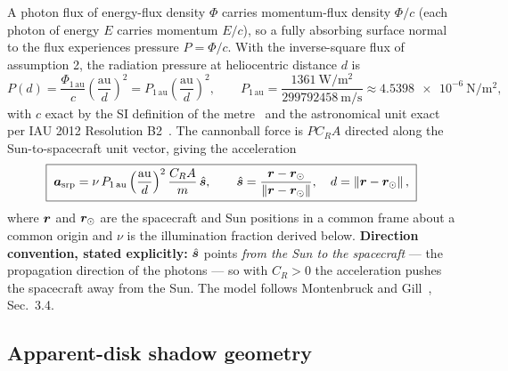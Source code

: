 A photon flux of energy-flux density $\Phi$ carries momentum-flux
density $\Phi / c$ (each photon of energy $E$ carries momentum $E/c$),
so a fully absorbing surface normal to the flux experiences pressure
$P = \Phi / c$. With the inverse-square flux of assumption 2, the
radiation pressure at heliocentric distance $d$ is
\begin{equation}
  P(d) = \frac{\Phi_{1\,\mathrm{au}}}{c}
         \left( \frac{\mathrm{au}}{d} \right)^{2}
       = P_{1\,\mathrm{au}} \left( \frac{\mathrm{au}}{d} \right)^{2},
  \qquad
  P_{1\,\mathrm{au}} = \frac{\qty{1361}{\watt\per\metre\squared}}
                            {\qty{299792458}{\metre\per\second}}
                     \approx \qty{4.5398e-6}{\newton\per\metre\squared},
  \label{eq:srp:pressure}
\end{equation}
with $c$ exact by the SI definition of the metre~\cite{bipm2019} and the
astronomical unit exact per IAU 2012 Resolution B2~\cite{iau2012b2}. The
cannonball force is $P C_R A$ directed along the Sun-to-spacecraft unit
vector, giving the acceleration
\begin{equation}
  \boxed{\;
  \bm{a}_{\mathrm{srp}}
    = \nu \, P_{1\,\mathrm{au}}
      \left( \frac{\mathrm{au}}{d} \right)^{2}
      \frac{C_R A}{m} \, \hat{\bm{s}},
  \qquad
  \hat{\bm{s}} = \frac{\bm{r} - \bm{r}_{\odot}}
                      {\left\lVert \bm{r} - \bm{r}_{\odot} \right\rVert},
  \quad
  d = \left\lVert \bm{r} - \bm{r}_{\odot} \right\rVert,
  \;}
  \label{eq:srp:cannonball}
\end{equation}
where $\bm{r}$ and $\bm{r}_{\odot}$ are the spacecraft and Sun positions
in a common frame about a common origin and $\nu$ is the illumination
fraction derived below. \textbf{Direction convention, stated
explicitly:} $\hat{\bm{s}}$ points \emph{from the Sun to the
spacecraft} --- the propagation direction of the photons --- so with
$C_R > 0$ the acceleration pushes the spacecraft away from the Sun. The
model follows Montenbruck and Gill~\cite{montenbruck2000}, Sec.~3.4.

\subsection{Apparent-disk shadow geometry}

